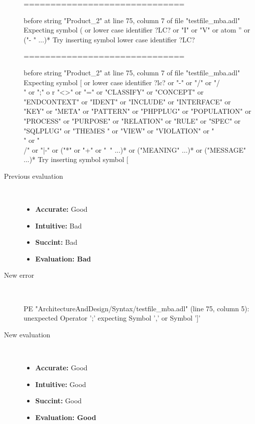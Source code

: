 \begin{description}
\begin{haskell}
==============================

before string "Product_2" at line 75, column 7 of file "testfile_mba.adl"
Expecting symbol ( or lower case identifier ?LC? or "I" or "V" or atom '' or ("-
" ...)*
Try inserting symbol lower case identifier ?LC?

==============================

before string "Product_2" at line 75, column 7 of file "testfile_mba.adl"
Expecting symbol [ or lower case identifier ?lc? or "-" or "/" or "/\\" or ";" o
r "<>" or "=" or "CLASSIFY" or "CONCEPT" or "ENDCONTEXT" or "IDENT" or "INCLUDE"
 or "INTERFACE" or "KEY" or "META" or "PATTERN" or "PHPPLUG" or "POPULATION" or
"PROCESS" or "PURPOSE" or "RELATION" or "RULE" or "SPEC" or "SQLPLUG" or "THEMES
" or "VIEW" or "VIOLATION" or "\\" or "\\/" or "|-" or ("*" or "+" or "~" ...)*
or ("MEANING" ...)* or ("MESSAGE" ...)*
Try inserting symbol symbol [
\end{haskell}
  \item[Previous evaluation]~\\
    \begin{itemize}
    \item \textbf{Accurate:} Good
    \item \textbf{Intuitive:} Bad
    \item \textbf{Succint:} Bad
    \item \textbf{Evaluation: Bad}
    \end{itemize}
  \item[New error]~\\
\begin{haskell}
PE "ArchitectureAndDesign/Syntax/testfile_mba.adl" (line 75, column 5):
unexpected Operator ';'
expecting Symbol ',' or Symbol ']'\end{haskell}
  \item[New evaluation]~\\
    \begin{itemize}
    \item \textbf{Accurate:} Good
    \item \textbf{Intuitive:} Good
    \item \textbf{Succint:} Good
    \item \textbf{Evaluation: Good
}
    \end{itemize}
  \end{description}

